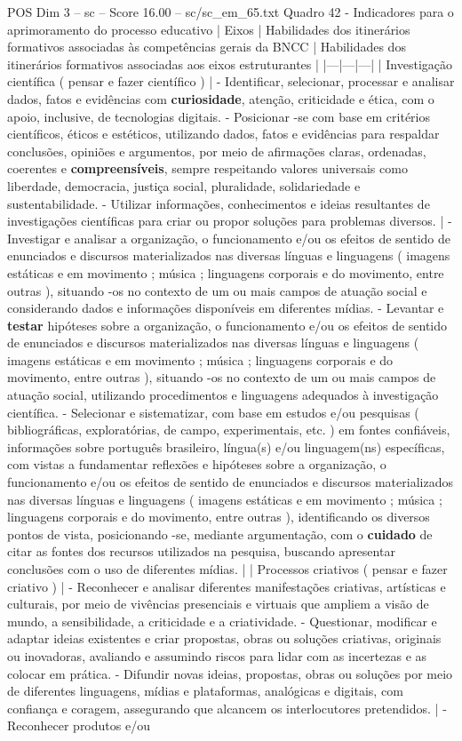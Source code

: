 \begin{textsample}{POS Dim 3 – sc – Score 16.00 – sc/sc\_em\_65.txt}
Quadro 42 - Indicadores para o aprimoramento do processo educativo | Eixos | Habilidades dos itinerários formativos associadas às competências gerais da BNCC | Habilidades dos itinerários formativos associadas aos eixos estruturantes | |---|---|---| | Investigação científica ( pensar e fazer científico ) | - Identificar, selecionar, processar e analisar dados, fatos e evidências com \textbf{curiosidade}, atenção, criticidade e ética, com o apoio, inclusive, de tecnologias digitais. - Posicionar -se com base em critérios científicos, éticos e estéticos, utilizando dados, fatos e evidências para respaldar conclusões, opiniões e argumentos, por meio de afirmações claras, ordenadas, coerentes e \textbf{compreensíveis}, sempre respeitando valores universais como liberdade, democracia, justiça social, pluralidade, solidariedade e sustentabilidade. - Utilizar informações, conhecimentos e ideias resultantes de investigações científicas para criar ou propor soluções para problemas diversos. | - Investigar e analisar a organização, o funcionamento e/ou os efeitos de sentido de enunciados e discursos materializados nas diversas línguas e linguagens ( imagens estáticas e em movimento ; música ; linguagens corporais e do movimento, entre outras ), situando -os no contexto de um ou mais campos de atuação social e considerando dados e informações disponíveis em diferentes mídias. - Levantar e \textbf{testar} hipóteses sobre a organização, o funcionamento e/ou os efeitos de sentido de enunciados e discursos materializados nas diversas línguas e linguagens ( imagens estáticas e em movimento ; música ; linguagens corporais e do movimento, entre outras ), situando -os no contexto de um ou mais campos de atuação social, utilizando procedimentos e linguagens adequados à investigação científica. - Selecionar e sistematizar, com base em estudos e/ou pesquisas ( bibliográficas, exploratórias, de campo, experimentais, etc. ) em fontes confiáveis, informações sobre português brasileiro, língua(s) e/ou linguagem(ns) específicas, com vistas a fundamentar reflexões e hipóteses sobre a organização, o funcionamento e/ou os efeitos de sentido de enunciados e discursos materializados nas diversas línguas e linguagens ( imagens estáticas e em movimento ; música ; linguagens corporais e do movimento, entre outras ), identificando os diversos pontos de vista, posicionando -se, mediante argumentação, com o \textbf{cuidado} de citar as fontes dos recursos utilizados na pesquisa, buscando apresentar conclusões com o uso de diferentes mídias. | | Processos criativos ( pensar e fazer criativo ) | - Reconhecer e analisar diferentes manifestações criativas, artísticas e culturais, por meio de vivências presenciais e virtuais que ampliem a visão de mundo, a sensibilidade, a criticidade e a criatividade. - Questionar, modificar e adaptar ideias existentes e criar propostas, obras ou soluções criativas, originais ou inovadoras, avaliando e assumindo riscos para lidar com as incertezas e as colocar em prática. - Difundir novas ideias, propostas, obras ou soluções por meio de diferentes linguagens, mídias e plataformas, analógicas e digitais, com confiança e coragem, assegurando que alcancem os interlocutores pretendidos. | - Reconhecer produtos e/ou 
\end{textsample}
